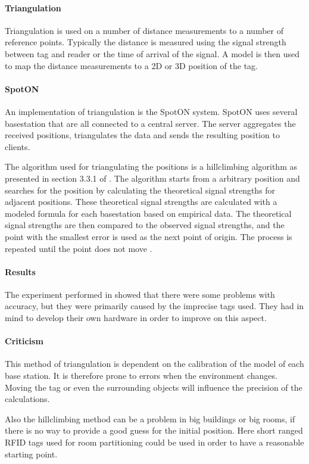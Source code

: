 \paragraph{Triangulation}
Triangulation is used on a number of distance measurements to a number of reference points. 
Typically the distance is measured using the signal strength between tag and reader or the time of arrival of the signal.
A model is then used to map the distance measurements to a 2D or 3D position of the tag.\cite{rfidreview}

\paragraph{SpotON}
An implementation of triangulation is the SpotON system\cite{spoton}.
SpotON uses several basestation that are all connected to a central server.
The server aggregates the received positions, triangulates the data and sends the resulting position to clients. \cite{spoton}

The algorithm used for triangulating the positions is a hillclimbing algorithm as presented in section 3.3.1 of \citet{spoton}.
The algorithm starts from a arbitrary position and searches for the position by calculating the theoretical signal strengths for adjacent positions.
These theoretical signal strengths are calculated with a modeled formula for each basestation based on empirical data.
The theoretical signal strengths are then compared to the observed signal strengths, and the point with the smallest error is used as the next point of origin.
The process is repeated until the point does not move \cite{spoton}.

\paragraph{Results}
The experiment performed in \citet{spoton} showed that there were some problems with accuracy, but they were primarily caused by the imprecise tags used.
They had in mind to develop their own hardware in order to improve on this aspect.

\paragraph{Criticism}
This method of triangulation is dependent on the calibration of the model of each base station.
It is therefore prone to errors when the environment changes.
Moving the tag or even the surrounding objects will influence the precision of the calculations.

Also the hillclimbing method can be a problem in big buildings or big rooms, if there is no way to provide a good guess for the initial position.
Here short ranged RFID tags used for room partitioning could be used in order to have a reasonable starting point.

